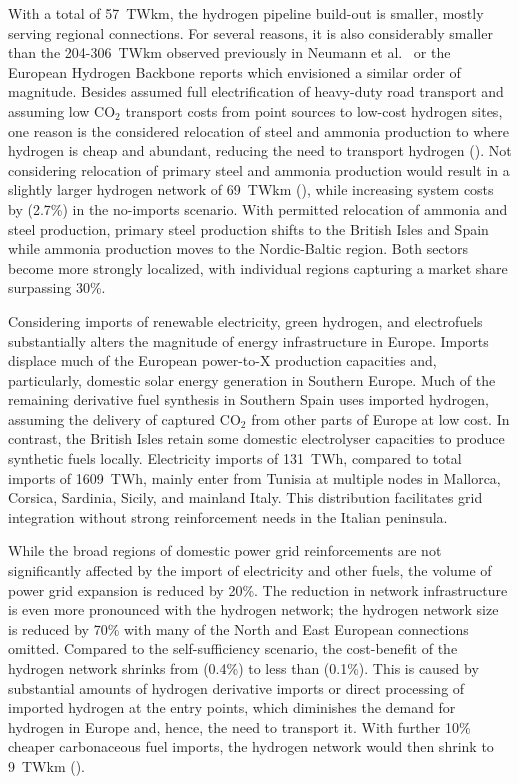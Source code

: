 
With a total of 57~TWkm, the hydrogen pipeline build-out is smaller, mostly
serving regional connections. For several reasons, it is also considerably
smaller than the 204-306~TWkm observed previously in Neumann et
al.~\cite{neumannPotentialRoleHydrogen2023} or the European Hydrogen Backbone
reports\cite{gasforclimateEuropeanHydrogen2022} which envisioned a similar order
of magnitude. Besides assumed full electrification of heavy-duty road
transport\cite{} and assuming low CO$_2$ transport costs from point sources to
low-cost hydrogen sites,\cite{hofmannH2CO2Network2024} one reason is the
considered relocation of steel and ammonia production to where hydrogen is cheap
and abundant, reducing the need to transport hydrogen
(). Not considering relocation of primary steel and
ammonia production would result in a slightly larger hydrogen network of 69~TWkm
(), while increasing system costs by  (2.7\%)
in the no-imports scenario. With permitted relocation of ammonia and steel
production, primary steel production shifts to the British Isles and Spain while
ammonia production moves to the Nordic-Baltic region. Both sectors become more
strongly localized, with individual regions capturing a market share surpassing
30\%.


Considering imports of renewable electricity, green hydrogen, and electrofuels
substantially alters the magnitude of energy infrastructure in Europe. Imports
displace much of the European power-to-X production capacities and,
particularly, domestic solar energy generation in Southern Europe. Much of the
remaining derivative fuel synthesis in Southern Spain uses imported hydrogen,
assuming the delivery of captured CO$_2$ from other parts of Europe at low
cost.\cite{hofmannH2CO2Network2024} In contrast, the British Isles retain some
domestic electrolyser capacities to produce synthetic fuels locally. Electricity
imports of 131~TWh, compared to total imports of 1609~TWh, mainly enter from
Tunisia at multiple nodes in Mallorca, Corsica, Sardinia, Sicily, and mainland
Italy. This distribution facilitates grid integration without strong
reinforcement needs in the Italian peninsula.

While the broad regions of domestic power grid reinforcements are not
significantly affected by the import of electricity and other fuels, the volume
of power grid expansion is reduced by 20\%. The reduction in network
infrastructure is even more pronounced with the hydrogen network; the hydrogen
network size is reduced by 70\% with many of the North and East European
connections omitted. Compared to the self-sufficiency scenario, the cost-benefit
of the hydrogen network shrinks from  (0.4\%) to less than 
(0.1\%). This is caused by substantial amounts of hydrogen derivative imports or
direct processing of imported hydrogen at the entry points, which diminishes the
demand for hydrogen in Europe and, hence, the need to transport it. With further
10\% cheaper carbonaceous fuel imports, the hydrogen network would then shrink
to 9~TWkm ().

